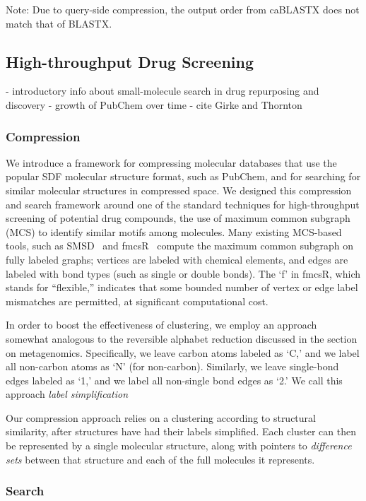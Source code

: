 \documentclass[review,preprint,12pt]{elsarticle}
\theoremstyle{definition}
\theoremstyle{remark}
\numberwithin{equation}{section}
\begin{document}
Note: Due to query-side compression, the output order from caBLASTX does not
match that of BLASTX.

\subsection*{High-throughput Drug Screening}

- introductory info about small-molecule search in drug repurposing and discovery
- growth of PubChem over time
- cite Girke and Thornton

\subsubsection*{Compression}

We introduce a framework for compressing molecular databases that use the 
popular SDF molecular structure format, such as PubChem, and for searching for 
similar molecular structures in compressed space.
We designed this compression and search framework around one of the standard 
techniques for high-throughput screening of potential drug compounds, the use 
of maximum common subgraph (MCS) to identify similar motifs among molecules.
Many existing MCS-based tools, such as SMSD~\cite{thornton} and 
fmcsR~\cite{girke} compute the maximum common subgraph on fully labeled graphs; 
vertices are labeled with chemical elements, and edges are labeled with bond 
types (such as single or double bonds).
The `f' in fmcsR, which stands for ``flexible,'' indicates that some bounded 
number of vertex or edge label mismatches are permitted, at significant 
computational cost.

In order to boost the effectiveness of clustering, we employ an approach
somewhat analogous to the reversible alphabet reduction discussed in the section
on metagenomics.
Specifically, we leave carbon atoms labeled as `C,' and we label all non-carbon
atoms as `N' (for non-carbon).
Similarly, we leave single-bond edges labeled as `1,' and we label all 
non-single bond edges as `2.'
We call this approach \emph{label simplification}

Our compression approach relies on a clustering according to structural 
similarity, after structures have had their labels simplified.
Each cluster can then be represented by a single molecular structure, along 
with pointers to \emph{difference sets} between that structure and each of the 
full molecules it represents.



\subsubsection*{Search}
\end{document}
